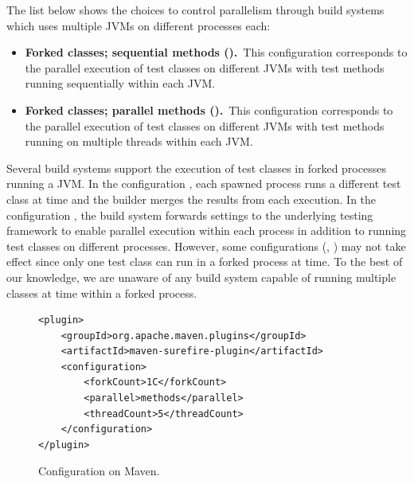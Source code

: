 The list below shows the choices to control parallelism through build
systems which uses multiple JVMs on different processes each:

\begin{itemize}
\item
    \textbf{Forked classes; sequential methods (\ForkSeq).}~This
        configuration corresponds to the parallel execution of test
        classes on different JVMs with test methods running
        sequentially within each JVM.
\item
    \textbf{Forked classes; parallel methods (\ForkParMeth).}~This
        configuration corresponds to the parallel execution of test
        classes on different JVMs with test methods running on
        multiple threads within each JVM.
\end{itemize}

Several build systems support the execution of test classes in forked
processes running a JVM. In the configuration \ForkSeq{}, each spawned
process runs a different test class at time and the builder merges the
results from each execution. In the configuration \ForkParMeth{}, the
build system forwards settings to the underlying testing framework to
enable parallel execution within each process in addition to running
test classes on different processes.  However, some configurations
(\eg, \ParClassSeqMeth) may not take effect since only one test class
can run in a forked process at time.  To the best of our knowledge, we
are unaware of any build system capable of running multiple classes at
time within a forked process.





\begin{figure}[h!]
\centering
\scriptsize
{}
\begin{lstlisting}
<plugin>
    <groupId>org.apache.maven.plugins</groupId>
    <artifactId>maven-surefire-plugin</artifactId>
    <configuration>
        <forkCount>1C</forkCount>
        <parallel>methods</parallel>
        <threadCount>5</threadCount>
    </configuration>
</plugin>
\end{lstlisting}
    \caption{\label{fig:surefire} Configuration \ForkParMeth{} on Maven.}
\end{figure}


